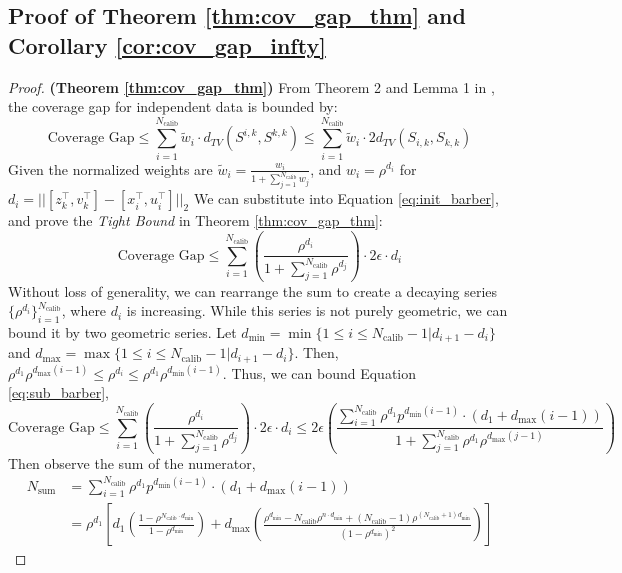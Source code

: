 \documentclass{l4dc2026}
\newcommand{\T}{^\top}
\begin{document}
\subsection{Proof of Theorem \ref{thm:cov_gap_thm} and Corollary \ref{cor:cov_gap_infty}}
\begin{proof} \textbf{(Theorem \ref{thm:cov_gap_thm})}
From Theorem 2 and Lemma 1 in \citet{barber2023conformal}, the coverage gap for independent data is bounded by:
\begin{equation}\label{eq:init_barber}
\text{Coverage Gap} \le \sum_{i=1}^{N_\textrm{calib}} \tilde{w}_i \cdot d_{TV}(S^{i,k}, S^{k,k}) \le \sum_{i=1}^{N_\textrm{calib}} \tilde{w}_i \cdot 2 d_{TV}(S_{i,k}, S_{k,k})
\end{equation}
Given the normalized weights are $\tilde{w}_i = \frac{w_i}{1 + \sum_{j=1}^{N_\textrm{calib}} w_j}$, and $w_i = \rho^{d_i}$ for $d_i = ||[z_k\T,v_k\T] - [x_i\T,u_i\T]||_2$
We can substitute into Equation \ref{eq:init_barber}, and prove the \textit{Tight Bound} in Theorem \ref{thm:cov_gap_thm}:
\begin{equation}\label{eq:sub_barber}
\text{Coverage Gap} \le \sum_{i=1}^{N_\textrm{calib}} \left( \frac{\rho^{d_i}}{1 + \sum_{j=1}^{N_\textrm{calib}} \rho^{d_j}} \right) \cdot 2\epsilon \cdot d_i
\end{equation}
Without loss of generality, we can rearrange the sum to create a decaying series $\{\rho^{d_i}\}_{i=1}^{N_\textrm{calib}}$, where $d_i$ is increasing. While this series is not purely geometric, we can bound it by two geometric series. Let $d_\text{min} = \min\{1 \leq i \leq N_\textrm{calib}-1 | d_{i+1} - d_i\}$ and $d_\text{max} = \max\{1 \leq i \leq N_\textrm{calib}-1 | d_{i+1} - d_i\}$. Then, $\rho^{d_1}\rho^{d_\text{max}(i-1)} \leq \rho^{d_i}  \leq \rho^{d_1}\rho^{d_\text{min}(i-1)}$. Thus, we can bound Equation \ref{eq:sub_barber}, 
$$
\text{Coverage Gap} \le \sum_{i=1}^{N_\textrm{calib}} \left( \frac{\rho^{d_i}}{1 + \sum_{j=1}^{N_\textrm{calib}} \rho^{d_j}} \right) \cdot 2\epsilon \cdot d_i \leq 2\epsilon \left( \frac{\sum_{i=1}^{N_\textrm{calib}}\rho^{d_1}p^{d_\text{min}(i-1)}\cdot (d_1 + d_\text{max}(i-1))}{1 + \sum_{j=1}^{N_\textrm{calib}} \rho^{d_1}\rho^{d_\text{max}(j-1)}} \right) 
$$
Then observe the sum of the numerator, 
\begin{align}
N_\text{sum} &= \sum_{i=1}^{N_\textrm{calib}}\rho^{d_1}p^{d_\text{min}(i-1)}\cdot (d_1 + d_\text{max}(i-1)) \\
&=\rho^{d_1} \left[ d_1 \left( \frac{1 - \rho^{N_\textrm{calib} \cdot d_\text{min}}}{1 - \rho^{d_\text{min}}} \right) + d_\text{max} \left( \frac{\rho^{d_\text{min}} - N_\textrm{calib} \rho^{n \cdot d_\text{min}} + (N_\textrm{calib}-1)\rho^{(N_\textrm{calib}+1)d_\text{min}}}{(1-\rho^{d_\text{min}})^2} \right) \right]
\end{align}


\end{proof}
\end{document}

